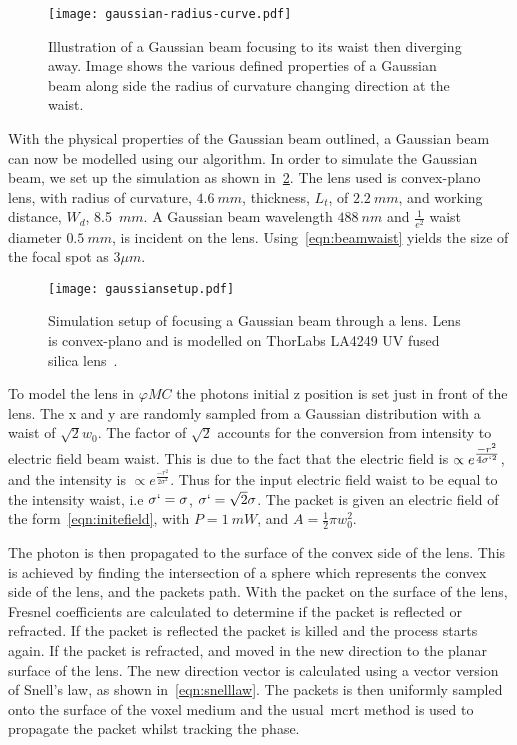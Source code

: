 \begin{figure}[!ht]
    \centering
    \texttt{[image: gaussian-radius-curve.pdf]}
    \caption{Illustration of a Gaussian beam focusing to its waist then diverging away. Image shows the various defined properties of a Gaussian beam along side the radius of curvature changing direction at the waist.}
    \label{fig:gbeamills}
\end{figure}

With the physical properties of the Gaussian beam outlined, a Gaussian beam can now be modelled using our algorithm.
In order to simulate the Gaussian beam, we set up the simulation as shown in~\cref{fig:gausssetup}.
The lens used is convex-plano lens, with radius of curvature, $4.6~mm$, thickness, $L_t$, of $2.2~mm$, and working distance, $W_d$, 8.5~$mm$.
A Gaussian beam wavelength $488~nm$ and $\tfrac{1}{e^2}$ waist diameter $0.5~mm$, is incident on the lens.
Using~\cref{eqn:beamwaist} yields the size of the focal spot as $3\mu m$.

\begin{figure}[!ht]
    \centering
    \texttt{[image: gaussiansetup.pdf]}
    \caption{Simulation setup of focusing a Gaussian beam through a lens. Lens is convex-plano and is modelled on ThorLabs LA4249 UV fused silica lens~\cite{thorlens}.}
    \label{fig:gausssetup}
\end{figure}

To model the lens in $\varphi MC$ the photons initial z position is set just in front of the lens.
The x and y are randomly sampled from a Gaussian distribution with a waist of $\sqrt{2}w_0$.
The factor of $\sqrt{2}$ accounts for the conversion from intensity to electric field beam waist.
This is due to the fact that the electric field is $\propto e^{\tfrac{-r^2}{4\sigma`^2}}$, and the intensity is $\propto e^{\tfrac{-r^2}{2\sigma^2}}$.
Thus for the input electric field waist to be equal to the intensity waist, i.e $\sigma`=\sigma$, $\sigma`=\sqrt{2}\sigma$.
The packet is given an electric field of the form~\cref{eqn:initefield}, with $P=1~mW$, and $A=\tfrac{1}{2}\pi w_0^2$.

The photon is then propagated to the surface of the convex side of the lens.
This is achieved by finding the intersection of a sphere which represents the convex side of the lens, and the packets path.
With the packet on the surface of the lens, Fresnel coefficients are calculated to determine if the packet is reflected or refracted.
If the packet is reflected the packet is killed and the process starts again.
If the packet is refracted, and moved in the new direction to the planar surface of the lens.
The new direction vector is calculated using a vector version of Snell's law, as shown in~\cref{eqn:snelllaw}.
The packets is then uniformly sampled onto the surface of the voxel medium and the usual~\gls*{mcrt} method is used to propagate the packet whilst tracking the phase.

